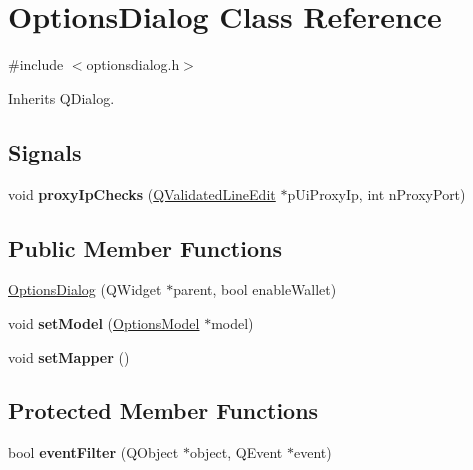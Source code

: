 \hypertarget{class_options_dialog}{}\section{Options\+Dialog Class Reference}
\label{class_options_dialog}


{\ttfamily \#include $<$optionsdialog.\+h$>$}



Inherits Q\+Dialog.

\subsection*{Signals}
\begin{DoxyCompactItemize}
\item 
\mbox{\label{class_options_dialog_a5dcd50233fb5279ca373060fffca6ec7}} 
void {\bfseries proxy\+Ip\+Checks} (\mbox{\hyperlink{class_q_validated_line_edit}{Q\+Validated\+Line\+Edit}} $\ast$p\+Ui\+Proxy\+Ip, int n\+Proxy\+Port)
\end{DoxyCompactItemize}
\subsection*{Public Member Functions}
\begin{DoxyCompactItemize}
\item 
\mbox{\hyperlink{class_options_dialog_ac74fd1c2837d30f6687cb1898d99f8d1}{Options\+Dialog}} (Q\+Widget $\ast$parent, bool enable\+Wallet)
\item 
\mbox{\label{class_options_dialog_a11e902a52cb7472497d14e70cd9399d9}} 
void {\bfseries set\+Model} (\mbox{\hyperlink{class_options_model}{Options\+Model}} $\ast$model)
\item 
\mbox{\label{class_options_dialog_a2088ec5bbb90ec27675f441e750e55b8}} 
void {\bfseries set\+Mapper} ()
\end{DoxyCompactItemize}
\subsection*{Protected Member Functions}
\begin{DoxyCompactItemize}
\item 
\mbox{\label{class_options_dialog_abf2b8046ca9bce3f2c1f04e329468983}} 
bool {\bfseries event\+Filter} (Q\+Object $\ast$object, Q\+Event $\ast$event)
\end{DoxyCompactItemize}


